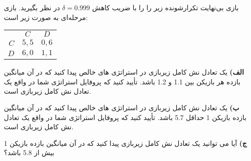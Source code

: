 بازی بی‌نهایت تکرارشونده زیر را را با ضریب کاهش
$\delta = 0.999$
در نظر بگیرید. بازی مرحله‌ای به صورت زیر است:

\LTR 
\begin{latin}
    \begin{center}
        \begin{tabular}{r | c | c |}
            \multicolumn{1}{r}{} &
            \multicolumn{1}{c}{$C$} &
            \multicolumn{1}{c}{$D$} \\ \cline{2-3}
            $C$       & $5,5$   & $0,6$  \\ \cline{2-3}
            $D$       & $6,0$   & $1,1$  \\ \cline{2-3}
        \end{tabular}
    \end{center}
\end{latin}
\RTL

\vspace*{5pt}
\textbf{الف)}
یک تعادل نش کامل زیربازی در استراتژی های خالص پیدا کنید که در آن میانگین بازده هر بازیکن بین 1.1 و 1.2 باشد. تأیید کنید که پروفایل استراتژی شما در واقع یک تعادل نش کامل زیربازی است.

\vspace*{5pt}
\textbf{ب)}
یک تعادل نش کامل زیربازی در استراتژی های خالص پیدا کنید که در آن میانگین بازده بازیکن 1 حداقل 5.7 باشد. تأیید کنید که پروفایل استراتژی شما در واقع یک تعادل نش کامل زیربازی است.

\vspace*{5pt}
\textbf{ج)}
آیا می توانید یک تعادل نش کامل زیربازی پیدا کنید که در آن میانگین بازده بازیکن 1 بیش از 5.8 باشد؟